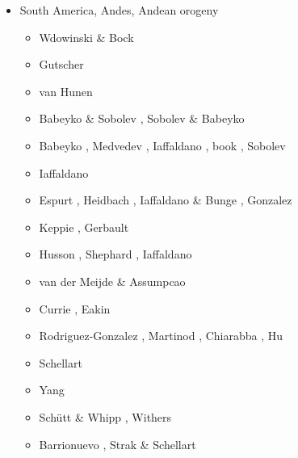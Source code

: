 \begin{itemize}
\item South America, Andes, Andean orogeny 

\begin{scriptsize}
\begin{itemize}
\item[\nineteenninetyfour] Wdowinski \& Bock \cite{wdbo94b}
\item[\twothousand] Gutscher \etal \cite{gusb00}
\item[\twothousandtwo] van Hunen \etal \cite{vavv02b}
\item[\twothousandfive] Babeyko \& Sobolev \cite{baso05}, Sobolev \& Babeyko \cite{soba05}
\item[\twothousandsix] Babeyko \etal \cite{basv06}, Medvedev \etal \cite{meph06},
                       Iaffaldano \etal \cite{iabd06}, book \cite{oncf06}, Sobolev \etal \cite{sobk06}
\item[\twothousandseven] Iaffaldano \etal \cite{iabb07}
\item[\twothousandeight] Espurt \etal \cite{esfm08}, Heidbach \etal \cite{heib08}, 
                         Iaffaldano \& Bunge \cite{iabu08}, Gonzalez \etal \cite{gogm08}
\item[\twothousandnine] Keppie \etal \cite{kecw09}, Gerbault \etal \cite{gecm09}
\item[\twothousandtwelve] Husson \etal \cite{hucf12}, Shephard \etal \cite{shlm12},
                          Iaffaldano \cite{iadc12}
\item[\twothousandthirteen] van der Meijde \& Assumpcao \cite{waja13}
\item[\twothousandfifteen] Currie \etal \cite{cudd15}, Eakin \etal \cite{ealw15}
\item[\twothousandsixteen] Rodriguez-Gonzalez \etal \cite{robn16}, Martinod \etal \cite{marl16}, 
                           Chiarabba \etal \cite{chdf16}, Hu \etal \cite{hulh16}
\item[\twothousandseventeen] Schellart \cite{sche17}
\item[\twothousandnineteen] Yang \etal \cite{yamg19}
\item[\twothousandtwenty] Sch{\"u}tt \& Whipp \cite{scwh20}, Withers \cite{with20}
\item[\twothousandtwentyone] Barrionuevo \etal \cite{balm21}, Strak \& Schellart \cite{stsc21}
\end{itemize}
\end{scriptsize}


\end{itemize}
